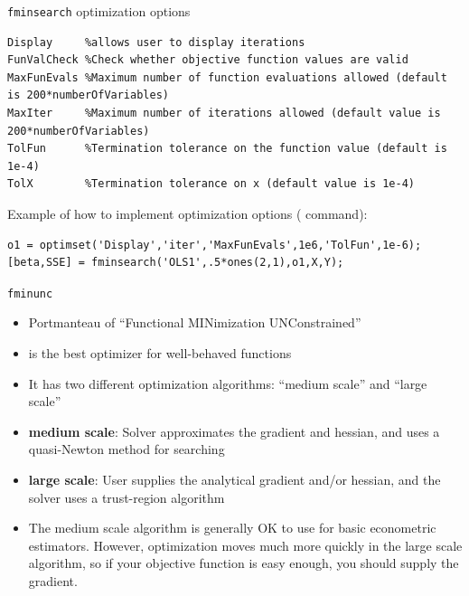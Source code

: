 \documentclass[english,xcolor=dvipsnames]{beamer}
\begin{document}
\begin{frame}[fragile]{\texttt{fminsearch} optimization options}
\begin{lstlisting}
Display     %allows user to display iterations 
FunValCheck %Check whether objective function values are valid
MaxFunEvals %Maximum number of function evaluations allowed (default is 200*numberOfVariables)
MaxIter     %Maximum number of iterations allowed (default value is 200*numberOfVariables)
TolFun      %Termination tolerance on the function value (default is 1e-4)
TolX        %Termination tolerance on x (default value is 1e-4)
\end{lstlisting}
Example of how to implement optimization options ( command):
\begin{lstlisting}
o1 = optimset('Display','iter','MaxFunEvals',1e6,'TolFun',1e-6);
[beta,SSE] = fminsearch('OLS1',.5*ones(2,1),o1,X,Y);
\end{lstlisting}
\end{frame}

\begin{frame}[fragile]{\texttt{fminunc}}
\begin{itemize}
	\item Portmanteau of ``Functional MINimization UNConstrained''
	\item {} is the best optimizer for well-behaved functions
	\item It has two different optimization algorithms: ``medium scale'' and ``large scale''
	\item \textbf{medium scale}: Solver approximates the gradient and hessian, and uses a quasi-Newton method for searching
	\item \textbf{large scale}: User supplies the analytical gradient and/or hessian, and the solver uses a trust-region algorithm
	\item The medium scale algorithm is generally OK to use for basic econometric estimators. However, optimization moves much more quickly in the large scale algorithm, so if your objective function is easy enough, you should supply the gradient.
\end{itemize}
\end{frame}
\end{document}
